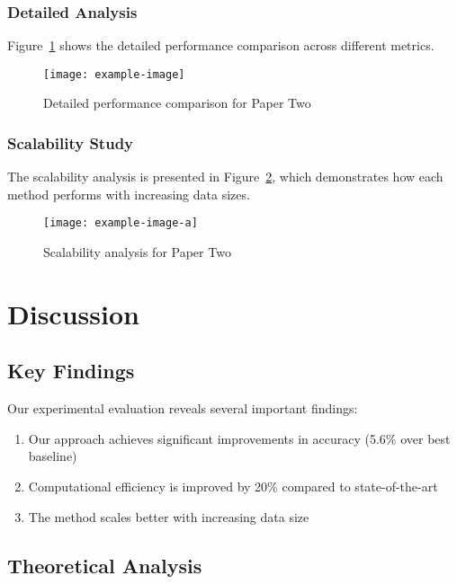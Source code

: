 \subsubsection{Detailed Analysis}

Figure~\ref{fig:papertwo-comparison} shows the detailed performance comparison across different metrics.

\begin{figure}[!htb]
    \centering
    \texttt{[image: example-image]}
    \caption{Detailed performance comparison for Paper Two}
    \label{fig:papertwo-comparison}
\end{figure}

\subsubsection{Scalability Study}

The scalability analysis is presented in Figure~\ref{fig:papertwo-scalability}, which demonstrates how each method performs with increasing data sizes.

\begin{figure}[!htb]
    \centering
    \texttt{[image: example-image-a]}
    \caption{Scalability analysis for Paper Two}
    \label{fig:papertwo-scalability}
\end{figure}

\section{Discussion}

\subsection{Key Findings}

Our experimental evaluation reveals several important findings:
\begin{enumerate}
    \item Our approach achieves significant improvements in accuracy (5.6\% over best baseline)
    \item Computational efficiency is improved by 20\% compared to state-of-the-art
    \item The method scales better with increasing data size
\end{enumerate}

\subsection{Theoretical Analysis}

